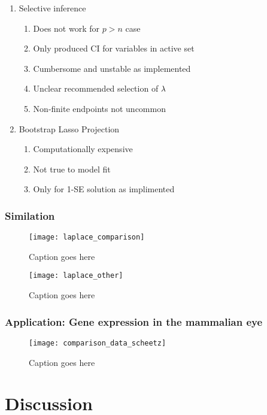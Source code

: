 \begin{enumerate}
\item Selective inference
\begin{enumerate}
\item Does not work for $p > n$ case
\item Only produced CI for variables in active set
\item Cumbersome and unstable as implemented
\item Unclear recommended selection of $\lambda$
\item Non-finite endpoints not uncommon
\end{enumerate}
\item{Bootstrap Lasso Projection}
\begin{enumerate}
\item Computationally expensive
\item Not true to model fit
\item Only for 1-SE solution as implimented
\end{enumerate}
\end{enumerate}

\subsubsection{Similation}

\begin{figure}
  \texttt{[image: laplace\_comparison]}
  \caption{\label{Fig:laplace_comparison} Caption goes here}
\end{figure}


\begin{figure}
  \texttt{[image: laplace\_other]}
  \caption{\label{Fig:laplace_other} Caption goes here}
\end{figure}


\subsubsection{Application: Gene expression in the mammalian eye}

\begin{figure}
  \texttt{[image: comparison\_data\_scheetz]}
  \caption{\label{Fig:comparison_data_scheetz} Caption goes here}
\end{figure}

\section{Discussion}

